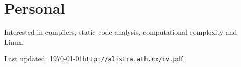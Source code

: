 \documentclass[letterpaper]{article}
\def\footerlink{http://alistra.ath.cx/cv.pdf}
\renewenvironment{itemize}{
  \begin{list}{}{
    \setlength{\leftmargin}{1.5em}
  }
}{
  \end{list}
}
\begin{document}
\section*{Personal}

\begin{itemize}
	\item Interested in compilers, static code analysis, computational complexity and Linux.
\end{itemize}

\bigskip

\begin{center}
  \begin{footnotesize}
    Last updated: \today \hfill \href{\footerlink}{\texttt{\footerlink}}
  \end{footnotesize}
\end{center}
\end{document}
